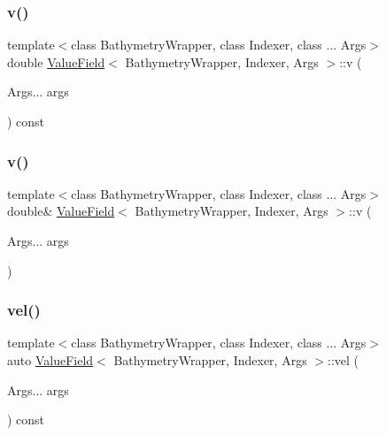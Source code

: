 \mbox{\label{structValueField_a390be8818fdf0bb7892f8e71a686fa2f}} 
\subsubsection{\texorpdfstring{v()}{v()}\hspace{0.1cm}{\footnotesize\ttfamily [1/2]}}
{\footnotesize\ttfamily template$<$class Bathymetry\+Wrapper, class Indexer, class ... Args$>$ \\
double \hyperlink{structValueField}{Value\+Field}$<$ Bathymetry\+Wrapper, Indexer, Args $>$\+::v (\begin{DoxyParamCaption}\item[{Args...}]{args }\end{DoxyParamCaption}) const\hspace{0.3cm}{\ttfamily [inline]}}

\mbox{\label{structValueField_a7bda60916e96525c4f28cc64c4e417c5}} 
\subsubsection{\texorpdfstring{v()}{v()}\hspace{0.1cm}{\footnotesize\ttfamily [2/2]}}
{\footnotesize\ttfamily template$<$class Bathymetry\+Wrapper, class Indexer, class ... Args$>$ \\
double\& \hyperlink{structValueField}{Value\+Field}$<$ Bathymetry\+Wrapper, Indexer, Args $>$\+::v (\begin{DoxyParamCaption}\item[{Args...}]{args }\end{DoxyParamCaption})\hspace{0.3cm}{\ttfamily [inline]}}

\mbox{\label{structValueField_a3788543655e0c949cd82d726fae40dfd}} 
\subsubsection{\texorpdfstring{vel()}{vel()}\hspace{0.1cm}{\footnotesize\ttfamily [1/2]}}
{\footnotesize\ttfamily template$<$class Bathymetry\+Wrapper, class Indexer, class ... Args$>$ \\
auto \hyperlink{structValueField}{Value\+Field}$<$ Bathymetry\+Wrapper, Indexer, Args $>$\+::vel (\begin{DoxyParamCaption}\item[{Args...}]{args }\end{DoxyParamCaption}) const\hspace{0.3cm}{\ttfamily [inline]}}

